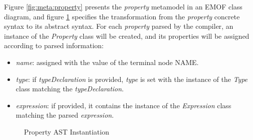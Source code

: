\begin{abstract-syntax}
Figure \ref{fig:meta:property} presents the \emph{property} metamodel
in an EMOF \cite{mof} class diagram,
and figure \ref{fig:ast:property} specifies
the transformation
from the \emph{property} concrete syntax to its abstract syntax.
For each \emph{property} parsed by the compiler,
an instance of the \emph{Property} class will be created,
and its properties will be assigned
according to parsed information:

\begin{itemize}

\item \emph{name}:
assigned with the value of the terminal node NAME.

\item \emph{type}:
if \emph{typeDeclaration} is provided,
\emph{type} is set with the instance of the \emph{Type} class
matching the \emph{typeDeclaration}.

\item \emph{expression}:
if provided,
it contains the instance of the \emph{Expression} class
matching the parsed \emph{expression}.

\end{itemize}
\end{abstract-syntax}

\begin{figure}
\verbatimfont{\small}
\begin{framed}

\end{framed}
\caption{Property AST Instantiation}
\label{fig:ast:property}
\end{figure}
